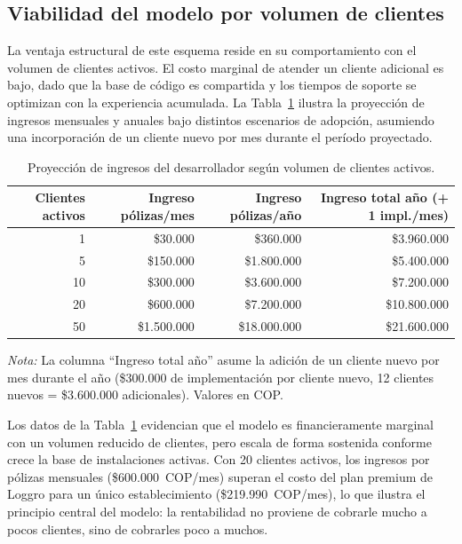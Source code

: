 \subsection*{Viabilidad del modelo por volumen de clientes}

La ventaja estructural de este esquema reside en su comportamiento con el volumen de
clientes activos. El costo marginal de atender un cliente adicional es bajo, dado que la
base de código es compartida y los tiempos de soporte se optimizan con la experiencia
acumulada. La Tabla~\ref{tab:escalabilidad} ilustra la proyección de ingresos mensuales
y anuales bajo distintos escenarios de adopción, asumiendo una incorporación de un
cliente nuevo por mes durante el período proyectado.

\begin{table}[H]
	\centering
	\caption{Proyección de ingresos del desarrollador según volumen de clientes activos.}
	\label{tab:escalabilidad}
	\begin{tabular}{r r r r}
		\hline
		\textbf{Clientes activos} &
		\textbf{Ingreso pólizas/mes} &
		\textbf{Ingreso pólizas/año} &
		\textbf{Ingreso total año (+ 1 impl./mes)} \\
		\hline
		1   & \$30.000     & \$360.000     & \$3.960.000  \\
		5   & \$150.000    & \$1.800.000   & \$5.400.000  \\
		10  & \$300.000    & \$3.600.000   & \$7.200.000  \\
		20  & \$600.000    & \$7.200.000   & \$10.800.000 \\
		50  & \$1.500.000  & \$18.000.000  & \$21.600.000 \\
		\hline
	\end{tabular}
	\footnotesize{\textit{Nota:} La columna ``Ingreso total año'' asume la adición de un cliente
		nuevo por mes durante el año (\$300.000 de implementación por cliente nuevo,
		12 clientes nuevos = \$3.600.000 adicionales). Valores en COP.}
\end{table}

Los datos de la Tabla~\ref{tab:escalabilidad} evidencian que el modelo es financieramente
marginal con un volumen reducido de clientes, pero escala de forma sostenida conforme
crece la base de instalaciones activas. Con 20 clientes activos, los ingresos por pólizas
mensuales (\$600.000~COP/mes) superan el costo del plan premium de Loggro para un único
establecimiento (\$219.990~COP/mes), lo que ilustra el principio central del modelo: la
rentabilidad no proviene de cobrarle mucho a pocos clientes, sino de cobrarles poco a
muchos.

